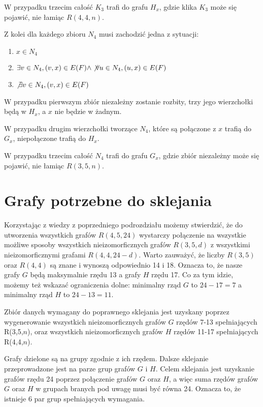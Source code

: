   W przypadku trzecim całość $K_3$ trafi do grafu $H_x$, gdzie klika $K_3$ może się pojawić, nie łamiąc $R(4,4,n)$.

  Z kolei dla każdego zbioru $N_4$ musi zachodzić jedna z sytuacji:

  \begin{enumerate}
    \item $x \in N_4$
    \item $ \exists v \in N_4, (v, x) \in E(F) \land \not \forall u \in N_4, (u,x) \in E(F)$ 
    \item $\not \exists v \in N_4, (v, x) \in E(F)$
  \end{enumerate} 

  W przypadku pierwszym zbiór niezależny zostanie rozbity, trzy jego wierzchołki będą w $H_x$, a $x$ nie będzie w żadnym.
  
  W przypadku drugim wierzchołki tworzące $N_4$, które są połączone z $x$ trafią do $G_x$, niepołączone trafią do $H_x$.
  
  W przypadku trzecim całość $N_4$ trafi do grafu $G_x$, gdzie zbiór niezależny może się pojawić, nie łamiąc $R(3,5,n)$.

\section{Grafy potrzebne do sklejania}

Korzystając z wiedzy z poprzedniego podrozdziału możemy stwierdzić, że do utworzenia wszystkich grafów $R(4,5,24)$ wystarczy połączenie na wszystkie możliwe sposoby
wszystkich nieizomorficznych grafów $R(3,5,d)$ z wszystkimi nieizomorficznymi grafami $R(4,4,24-d)$. 
Warto zauważyć, że liczby $R(3,5)$ oraz $R(4,4)$ są znane i wynoszą odpowiednio 14 i 18. Oznacza to, że nasze grafy $G$ będą maksymalnie rzędu 13 a grafy $H$ rzędu 17. Co za tym idzie, możemy też wskazać ograniczenia dolne:
minimalny rząd $G$ to $24-17=7$ a minimalny rząd $H$ to $24-13 = 11$.  

Zbiór danych wymagany do poprawnego sklejania jest uzyskany poprzez wygenerowanie wszystkich nieizomorficznych grafów $G$ rzędów 7-13 spełniających R(3,5,$n$), oraz wszystkich nieizomorficznych grafów $H$ rzędów 11-17 spełniających R(4,4,$n$).

Grafy dzielone są na grupy zgodnie z ich rzędem. Dalsze sklejanie przeprowadzone jest na parze grup grafów $G$ i $H$. Celem sklejania jest uzyskanie grafów rzędu 24 poprzez połączenie grafów $G$ oraz $H$, a więc suma rzędów grafów $G$ oraz $H$ w grupach branych pod uwagę musi być równa 24. Oznacza to, że istnieje 6 par grup spełniających wymagania.

